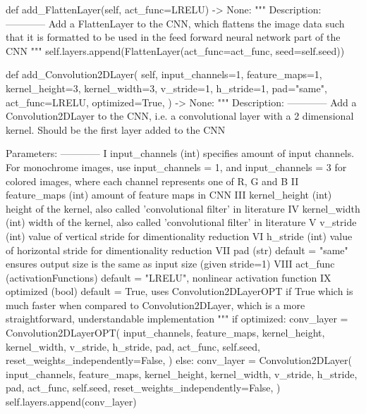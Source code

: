 \documentclass[%
oneside,                 %
final,                   %
10pt]{article}
\begin{document}
    def add_FlattenLayer(self, act_func=LRELU) -> None:
        """
        Description:
        ------------
            Add a FlattenLayer to the CNN, which flattens the image data such that it is formatted to
            be used in the feed forward neural network part of the CNN
        """
        self.layers.append(FlattenLayer(act_func=act_func, seed=self.seed))

    def add_Convolution2DLayer(
        self,
        input_channels=1,
        feature_maps=1,
        kernel_height=3,
        kernel_width=3,
        v_stride=1,
        h_stride=1,
        pad="same",
        act_func=LRELU,
        optimized=True,
    ) -> None:
        """
        Description:
        ------------
            Add a Convolution2DLayer to the CNN, i.e. a convolutional layer with a 2 dimensional kernel. Should be
            the first layer added to the CNN

        Parameters:
        ------------
            I   input_channels (int) specifies amount of input channels. For monochrome images, use input_channels
                = 1, and input_channels = 3 for colored images, where each channel represents one of R, G and B
            II  feature_maps (int) amount of feature maps in CNN
            III kernel_height (int) height of the kernel, also called 'convolutional filter' in literature
            IV  kernel_width (int) width of the kernel, also called 'convolutional filter' in literature
            V   v_stride (int) value of vertical stride for dimentionality reduction
            VI  h_stride (int) value of horizontal stride for dimentionality reduction
            VII pad (str) default = "same" ensures output size is the same as input size (given stride=1)
           VIII act_func (activationFunctions) default = "LRELU", nonlinear activation function
             IX optimized (bool) default = True, uses Convolution2DLayerOPT if True which is much faster when
                compared to Convolution2DLayer, which is a more straightforward, understandable implementation
        """
        if optimized:
            conv_layer = Convolution2DLayerOPT(
                input_channels,
                feature_maps,
                kernel_height,
                kernel_width,
                v_stride,
                h_stride,
                pad,
                act_func,
                self.seed,
                reset_weights_independently=False,
            )
        else:
            conv_layer = Convolution2DLayer(
                input_channels,
                feature_maps,
                kernel_height,
                kernel_width,
                v_stride,
                h_stride,
                pad,
                act_func,
                self.seed,
                reset_weights_independently=False,
            )
        self.layers.append(conv_layer)
\end{document}
